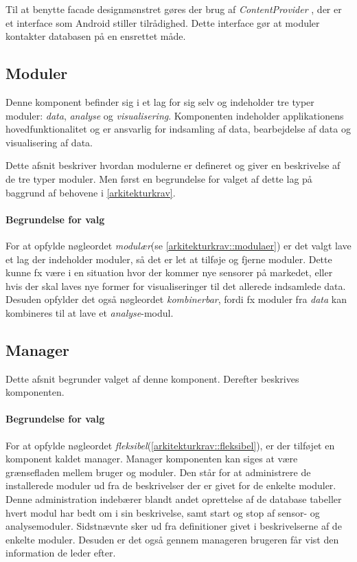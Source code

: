 Til at benytte facade designmønstret gøres der brug af \textit{ContentProvider} \citep{contentprovider}, der er et interface som Android stiller tilrådighed.
Dette interface gør at moduler kontakter databasen på en ensrettet måde.

\subsection{Moduler}
Denne komponent befinder sig i et lag for sig selv og indeholder tre typer moduler: \textit{data}, \textit{analyse} og \textit{visualisering}.
Komponenten indeholder applikationens hovedfunktionalitet og er ansvarlig for indsamling af data, bearbejdelse af data og visualisering af data.

Dette afsnit beskriver hvordan modulerne er defineret og giver en beskrivelse af de tre typer moduler.
Men først en begrundelse for valget af dette lag på baggrund af behovene i \cref{arkitekturkrav}.

\paragraph{Begrundelse for valg}
For at opfylde nøgleordet \textit{modulær}(se \cref{arkitekturkrav::modulaer}) er det valgt lave et lag der indeholder moduler, så det er let at tilføje og fjerne moduler.
Dette kunne fx være i en situation hvor der kommer nye sensorer på markedet, eller hvis der skal laves nye former for visualiseringer til det allerede indsamlede data.
Desuden opfylder det også nøgleordet \textit{kombinerbar}, fordi fx moduler fra \textit{data} kan kombineres til at lave et \textit{analyse}-modul.



\subsection{Manager}\label{subsec:arkitektur-Manager}
Dette afsnit begrunder valget af denne komponent.
Derefter beskrives komponenten.

\paragraph{Begrundelse for valg}
For at opfylde nøgleordet \textit{fleksibel}(\cref{arkitekturkrav::fleksibel}), er der tilføjet en komponent kaldet manager.
Manager komponenten kan siges at være grænsefladen mellem bruger og moduler.
Den står for at administrere de installerede moduler ud fra de beskrivelser der er givet for de enkelte moduler.
Denne administration indebærer blandt andet oprettelse af de database tabeller hvert modul har bedt om i sin beskrivelse, samt start og stop af sensor- og analysemoduler.
Sidstnævnte sker ud fra definitioner givet i beskrivelserne af de enkelte moduler.
Desuden er det også gennem manageren brugeren får vist den information de leder efter.

